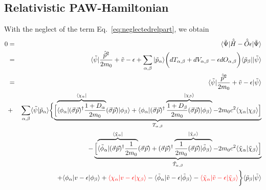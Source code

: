 \documentclass[11pt,a4paper]{report}
\begin{document}
\subsection{Relativistic PAW-Hamiltonian}
With the neglect of the term Eq.~\ref{eq:neglectedrelpart}, we obtain
\begin{eqnarray}
0&=&
\langle\tilde{\Psi}|\hat{\tilde{H}}-\hat{\tilde{O}}\epsilon|\tilde{\Psi}\rangle
\nonumber\\
&=&\langle\tilde\psi|
\frac{\hat{\vec{p}}^2}{2m_0}+\tilde{v}-\epsilon 
+\sum_{\alpha,\beta}|\tilde{p}_\alpha\rangle
\biggl(dT_{\alpha,\beta}+dV_{\alpha,\beta}-\epsilon dO_{\alpha,\beta}\biggr)
\langle\tilde{p}_\beta|
|\tilde{\psi}\rangle
\nonumber\\
&=&\langle\tilde\psi|
\frac{\hat{\vec{p}}^2}{2m_0}+\tilde{v}-\epsilon
|\tilde{\psi}\rangle
\nonumber\\
&+&\sum_{\alpha,\beta}\langle\tilde{\psi}|\tilde{p}_\alpha\rangle
\biggl\lbrace
\underbrace{\Bigl[
\overbrace{
\langle\phi_\alpha|(\vec{\sigma}\vec{p})^\dagger
\frac{1+D_\alpha}{2m_0}
}^{\langle\chi_\alpha|}
(\vec{\sigma}\vec{p})|\phi_\beta\rangle
+\langle\phi_\alpha|
(\vec{\sigma}\vec{p})^\dagger
\overbrace{\frac{1+D_\beta}{2m_0}(\vec{\sigma}\vec{p})
|\phi_\beta\rangle}^{|\chi_\beta\rangle}
-2m_0c^2\langle\chi_\alpha|\chi_\beta\rangle\Bigr]}_{T_{\alpha,\beta}}
\nonumber\\
%
&&\hspace{1.5cm}
-\underbrace{\Bigl[
\overbrace{\langle\tilde{\phi}_\alpha|
(\vec{\sigma}\vec{p})^\dagger\frac{1}{2m_0}
}^{\langle\tilde{\chi}_\alpha|}(\vec{\sigma}\vec{p})
+(\vec{\sigma}\vec{p})^\dagger
\overbrace{
\frac{1}{2m_0}(\vec{\sigma}\vec{p})
|\tilde{\phi}_\beta\rangle}^{|\tilde{\chi}_\beta\rangle}
-2m_0c^2\langle\tilde{\chi}_\alpha
|\tilde{\chi}_\beta\rangle\Bigr]}_{\tilde{T}_{\alpha,\beta}}
\nonumber\\
&&\hspace{1.5cm}+\langle\phi_\alpha|v-\epsilon|\phi_\beta\rangle
+\textcolor{red}{\langle\chi_\alpha|v-\epsilon|\chi_\beta\rangle}
-\langle\tilde{\phi}_\alpha|
\tilde{v}-\epsilon|\tilde{\phi}_\beta\rangle
-
\textcolor{red}{
\langle\tilde{\chi}_\alpha|\tilde{v}-\epsilon|\tilde{\chi}_\beta\rangle}
\biggr\rbrace\langle
\tilde{p}_\beta|\tilde{\psi}\rangle
\nonumber\\
\end{eqnarray}
\end{document}
